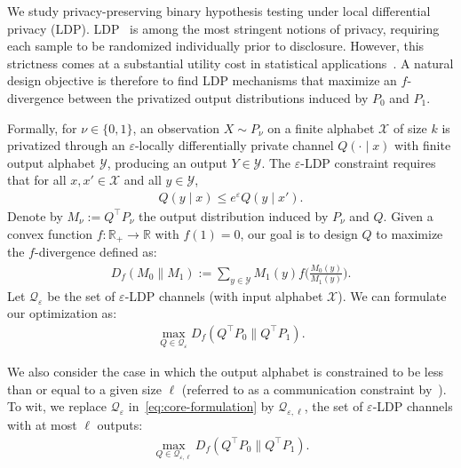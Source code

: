 \documentclass{article}
\theoremstyle{plain}
\theoremstyle{definition}
\theoremstyle{plain}
\newcommand{\eps}{\varepsilon}
\newcommand{\X}{\mathcal{X}}
\newcommand{\Y}{\mathcal{Y}}
\begin{document}
We study privacy-preserving binary hypothesis testing under local differential privacy (LDP).
LDP~\cite{Kasiviswanathan2011WhatCanWeLearnPrivately,Warner1965RandomizedResponse} is among the most stringent notions of privacy, requiring each sample to be randomized individually prior to disclosure.
However, this strictness comes at a substantial utility cost in statistical applications~\cite{Duchi2020TheRightComplexity,Asoodeh2024ContractionLDPMechanisms}.
A natural design objective is therefore to find LDP mechanisms that maximize an $f$-divergence between the privatized output distributions induced by $P_0$ and $P_1$.

Formally, for $\nu \in \{0,1\}$, an observation $X \sim P_\nu$ on a finite alphabet $\X$ of size $k$ is privatized through an $\eps$-locally differentially private channel $Q(\cdot \mid x)$ with finite output alphabet $\Y$, producing an output $Y \in \Y$. The $\eps$-LDP constraint requires that for all $x,x' \in \X$ and all $y \in \Y$,
\begin{align}
    Q(y \mid x) \le e^\eps Q(y \mid x').
\end{align}
Denote by $M_\nu := Q^\top P_\nu$ the output distribution induced by $P_\nu$ and $Q$. Given a convex function $f : \mathbb{R}_+ \to \mathbb{R}$ with $f(1) = 0$, our goal is to design $Q$ to maximize the $f$-divergence defined as:
\begin{align}
    D_f(M_0 \| M_1) := \sum_{y \in \Y} M_1(y) f\!\Big(\tfrac{M_0(y)}{M_1(y)}\Big).
\end{align}
Let $\mathcal{Q}_{\eps}$ be the set of $\eps$-LDP channels (with input alphabet $\X$). We can formulate our optimization as:
\begin{align}
    \label{eq:core-formulation}
    \max_{Q\in \mathcal Q_{\varepsilon}} D_f(Q^\top P_0\|Q^\top P_1).
\end{align}

We also consider the case in which the output alphabet is constrained to be less than or equal to a given size $\ell$ (referred to as a communication constraint by~\citet{Pensia2025BinaryTesting}). To wit, we replace $\mathcal{Q}_\eps$ in~\eqref{eq:core-formulation} by $\mathcal{Q}_{\eps,\ell}$, the set of $\varepsilon$-LDP channels with at most $\ell$ outputs:
\begin{align}
    \label{eq:core-formulation-output}
    \max_{Q\in \mathcal Q_{\varepsilon,\ell}} D_f(Q^\top P_0\|Q^\top P_1).
\end{align}
\end{document}
